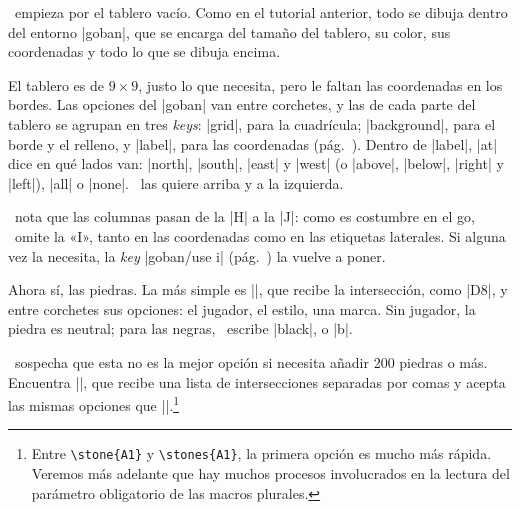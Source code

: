 \begin{goban}
\karu\ empieza por el tablero vacío. Como en el tutorial anterior, todo se dibuja dentro del entorno |goban|, que se encarga del tamaño del tablero, su color, sus coordenadas y todo lo que se dibuja encima.

\begin{codeexample}[width=4.4cm]
\begin{goban}
\end{goban}
\end{codeexample}

El tablero es de $9\times 9$, justo lo que necesita, pero le faltan las coordenadas en los bordes. Las opciones del |goban| van entre corchetes, y las de cada parte del tablero se agrupan en tres \emph{keys}: |grid|, para la cuadrícula; |background|, para el borde y el relleno, y |label|, para las coordenadas (pág.~\pageref{sec:tablero}). Dentro de |label|, |at| dice en qué lados van: |north|, |south|, |east| y |west| (o |above|, |below|, |right| y |left|), |all| o |none|. \karu\ las quiere arriba y a la izquierda.

\begin{codeexample}[width=4.7cm]
\begin{goban}[label = {at = {north, west}}]
\end{goban}
\end{codeexample}

\karu\ nota que las columnas pasan de la |H| a la |J|: como es costumbre en el go, \pgfgoname\ omite la «I», tanto en las coordenadas como en las etiquetas laterales. Si alguna vez la necesita, la \emph{key} |goban/use i| (pág.~\pageref{subsec:usei}) la vuelve a poner.

Ahora sí, las piedras. La más simple es |\stone|, que recibe la intersección, como |D8|, y entre corchetes sus opciones: el jugador, el estilo, una marca. Sin jugador, la piedra es neutral; para las negras, \karu\ escribe |black|, o |b|.

\begin{codeexample}[width=4.8cm]
\begin{goban}[label = {at = {north, west}}]
\end{goban}
\end{codeexample}

\karu\ sospecha que esta no es la mejor opción si necesita añadir 200 piedras o más. Encuentra |\stones|, que recibe una lista de intersecciones separadas por comas y acepta las mismas opciones que |\stone|.\footnote{Entre \texttt{\textbackslash stone\{A1\}} y \texttt{\textbackslash stones\{A1\}}, la primera opción es mucho más rápida. Veremos más adelante que hay muchos procesos involucrados en la lectura del parámetro obligatorio de las macros plurales.}


\end{goban}
